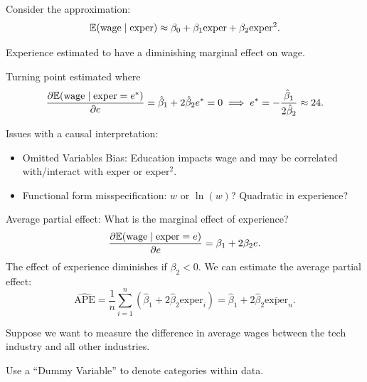 \begin{example}
	Consider the approximation: \[
		\mathbb{E}(\text{wage} \mid \text{exper}) \approx \beta_0 + \beta_1 \text{exper} + \beta_2 \text{exper}^2
	.\] 
	
	Experience estimated to have a diminishing marginal effect on wage.
	
	Turning point estimated where \[
		\frac{\partial \mathbb{E}(\text{wage} \mid \text{exper} = e^*)}{\partial e} = \hat{\beta}_1 + 2\hat{\beta}_2 e^* = 0 \implies e^* = -\frac{\hat{\beta}_1}{2\hat{\beta}_2} \approx 24
	.\] 
\end{example}

\begin{remark}
	Issues with a causal interpretation:
	\begin{itemize}
		\item Omitted Variables Bias: Education impacts wage and may be correlated with/interact with exper or exper$^2$.
		\item Functional form misspecification: $w$ or $\ln(w)$? Quadratic in experience?
	\end{itemize}
	
	Average partial effect: What is the marginal effect of experience? \[
		\frac{\partial \mathbb{E}(\text{wage} \mid \text{exper} = e)}{\partial e} = \beta_1 + 2\beta_2 e
	.\] 
	The effect of experience diminishes if $\beta_2 < 0$. We can estimate the average partial effect: \[
		\widehat{\text{APE}} = \frac{1}{n} \sum_{i=1}^{n} (\hat{\beta}_1 + 2\hat{\beta}_2 \text{exper}_i) = \hat{\beta}_1 + 2\hat{\beta}_2 \overline{\text{exper}}_n
	.\] 
\end{remark}

\begin{remark}
	Suppose we want to measure the difference in average wages between the tech industry and all other industries.
	
	Use a ``Dummy Variable'' to denote categories within data.
\end{remark}


